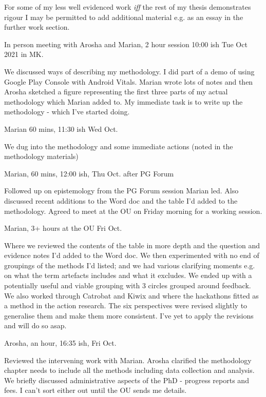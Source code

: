 For some of my less well evidenced work \emph{iff} the rest of my thesis demonstrates rigour I may be permitted to add additional material e.g. as an essay in the further work section.  

\dotfill

In person meeting with Arosha and Marian, 2 hour session 10:00 ish Tue  Oct 2021 in MK.

We discussed ways of describing my methodology. I did part of a demo of using Google Play Console with Android Vitals. Marian wrote lots of notes and then Arosha sketched a figure representing the first three parts of my actual methodology which Marian added to. My immediate task is to write up the methodology - which I've started doing.

\dotfill
Marian 60 mins, 11:30 ish Wed  Oct.

We dug into the methodology and some immediate actions (noted in the methodology materials)

\dotfill
Marian, 60 mins, 12:00 ish, Thu  Oct. after PG Forum

Followed up on epistemology from the PG Forum session Marian led. Also discussed recent additions to the Word doc and the table I'd added to the methodology. Agreed to meet at the OU on Friday morning for a working session.

\dotfill
Marian, 3+ hours at the OU Fri  Oct.

Where we reviewed the contents of the table in more depth and the question and evidence notes I'd added to the Word doc. We then experimented with no end of groupings of the methods I'd listed; and we had various clarifying moments e.g. on what the term artefacts includes and what it excludes.  We ended up with a potentially useful and viable grouping with 3 circles grouped around feedback. We also worked through Catrobat and Kiwix and where the hackathons fitted as a method in the action research. The six perspectives were revised slightly to generalise them and make them more consistent. I've yet to apply the revisions and will do so asap.

\dotfill
Arosha, an hour, 16:35 ish, Fri  Oct.

Reviewed the intervening work with Marian. Arosha clarified the methodology chapter needs to include all the methods including data collection and analysis. We briefly discussed administrative aspects of the PhD - progress reports and fees. I can't sort either out until the OU sends me details. 

